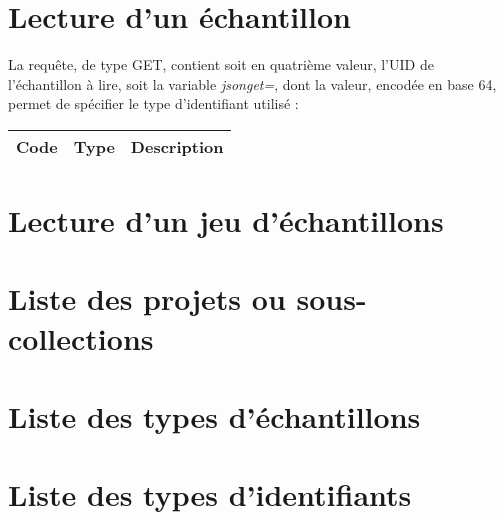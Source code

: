 \section{Lecture d'un échantillon}

La requête, de type GET, contient soit en quatrième valeur, l'UID de l'échantillon à lire, soit la variable \textit{jsonget=}, dont la valeur, encodée en base 64, permet de spécifier le type d'identifiant utilisé :
\begin{longtable}{|c|c|>{\raggedright\arraybackslash}p{6cm}|}
\hline 
Code & Type & Description \\ 
\hline \endhead

\end{longtable}

\section{Lecture d'un jeu d'échantillons}

\section{Liste des projets ou sous-collections}
\label{projectList}

\section{Liste des types d'échantillons}
\label{sampleTypeList}

\section{Liste des types d'identifiants}
\label{idtype}

